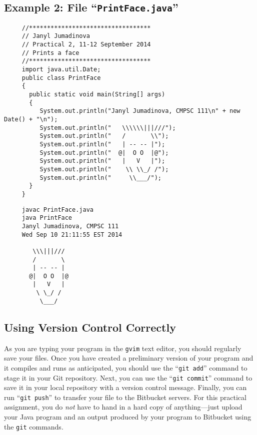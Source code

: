 \subsection*{Example 2: File ``{\tt PrintFace.java}''}
\begin{verbatim}
     //**********************************
     // Janyl Jumadinova
     // Practical 2, 11-12 September 2014
     // Prints a face
     //**********************************
     import java.util.Date;
     public class PrintFace
     {
       public static void main(String[] args)
       {
          System.out.println("Janyl Jumadinova, CMPSC 111\n" + new Date() + "\n");
          System.out.println("   \\\\\\|||///");
          System.out.println("   /       \\");
          System.out.println("   | -- -- |");
          System.out.println("  @|  O O  |@");
          System.out.println("   |   V   |");
          System.out.println("    \\ \\_/ /");
          System.out.println("     \\___/");
       }
     } 
\end{verbatim}
\begin{verbatim}
     javac PrintFace.java
     java PrintFace
     Janyl Jumadinova, CMPSC 111
     Wed Sep 10 21:11:55 EST 2014
          
        \\\|||///
        /       \
        | -- -- |
       @|  O O  |@
        |   V   |
         \ \_/ /
          \___/
\end{verbatim}

\subsection*{Using Version Control Correctly}

As you are typing your program in the {\tt gvim} text editor, you should regularly save your files.  Once you have
created a preliminary version of your program and it compiles and runs as anticipated, you should use the ``{\tt git
add}'' command to stage it in your Git repository.  Next, you can use the ``{\tt git commit}'' command to save it in
your local repository with a version control message.  Finally, you can run ``{\tt git push}'' to transfer your file to
the Bitbucket servers.  For this practical assignment, you do {\em not} have to hand in a hard copy of anything---just
upload your Java program and an output produced by your program to Bitbucket using the {\tt git} commands. 

